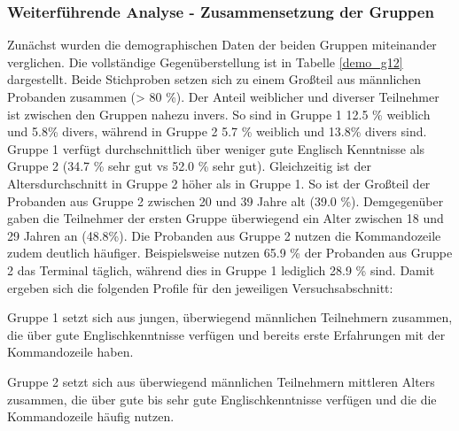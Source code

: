 \subsubsection{Weiterführende Analyse - Zusammensetzung der Gruppen}
Zunächst wurden die demographischen Daten der beiden Gruppen miteinander verglichen. Die vollständige Gegenüberstellung ist in Tabelle \ref{demo_g12} dargestellt. Beide Stichproben setzen sich zu einem Großteil aus männlichen Probanden zusammen (> 80 \%). Der Anteil weiblicher und diverser Teilnehmer ist zwischen den Gruppen nahezu invers. So sind in Gruppe 1 12.5 \% weiblich und 5.8\% divers, während in Gruppe 2 5.7 \% weiblich und 13.8\% divers sind. Gruppe 1 verfügt durchschnittlich über weniger gute Englisch Kenntnisse als Gruppe 2 (34.7 \% sehr gut vs 52.0 \% sehr gut). Gleichzeitig ist der Altersdurchschnitt in Gruppe 2 höher als in Gruppe 1. So ist der Großteil der Probanden aus Gruppe 2 zwischen 20 und 39 Jahre alt (39.0 \%). Demgegenüber gaben die Teilnehmer der ersten Gruppe überwiegend ein Alter zwischen 18 und 29 Jahren an (48.8\%). Die Probanden aus Gruppe 2 nutzen die Kommandozeile zudem deutlich häufiger. Beispielsweise nutzen 65.9 \% der Probanden aus Gruppe 2 das Terminal täglich, während dies in Gruppe 1 lediglich 28.9 \% sind. Damit ergeben sich die folgenden Profile für den jeweiligen Versuchsabschnitt:

Gruppe 1 setzt sich aus jungen, überwiegend männlichen Teilnehmern zusammen, die über gute Englischkenntnisse verfügen und bereits erste Erfahrungen mit der Kommandozeile haben. 

Gruppe 2 setzt sich aus überwiegend männlichen Teilnehmern mittleren Alters zusammen, die über gute bis sehr gute Englischkenntnisse verfügen und die die Kommandozeile häufig nutzen. 


